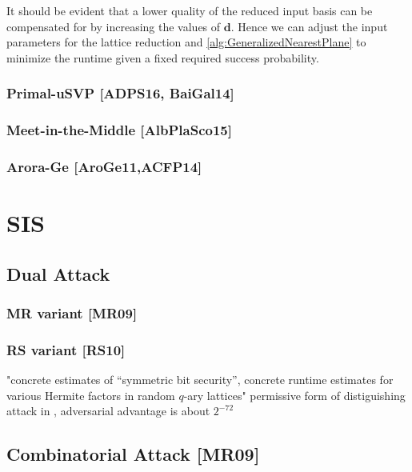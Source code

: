 It should be evident that a lower quality of the reduced input basis can be compensated for by increasing the values of $\textbf{d}$. Hence we can adjust the input parameters for the lattice reduction and \cref{alg:GeneralizedNearestPlane} to minimize the runtime given a fixed required success probability. %




\subsubsection{Primal-uSVP [ADPS16, BaiGal14]}
\subsubsection{Meet-in-the-Middle [AlbPlaSco15]}
\subsubsection{Arora-Ge [AroGe11,ACFP14]}


\section{SIS}
\subsection{Dual Attack}
\subsubsection{MR variant [MR09]}
\subsubsection{RS variant [RS10]}
"concrete estimates of ``symmetric bit security'', concrete runtime estimates for various Hermite factors in random $q$-ary lattices"
permissive form of distiguishing attack in \cite{MR09}, adversarial advantage is about $2^{-72}$
\subsection{Combinatorial Attack [MR09]}
